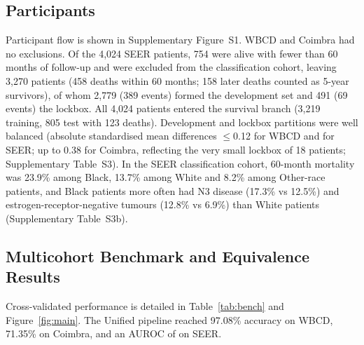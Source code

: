 \documentclass[11pt,a4paper]{article}
\begin{document}
\subsection{Participants}\label{sec:participants}
Participant flow is shown in Supplementary Figure~S1. WBCD and Coimbra had no exclusions. Of the 4,024 SEER patients, 754 were alive with fewer than 60 months of follow-up and were excluded from the classification cohort, leaving 3,270 patients (458 deaths within 60 months; 158 later deaths counted as 5-year survivors), of whom 2,779 (389 events) formed the development set and 491 (69 events) the lockbox. All 4,024 patients entered the survival branch (3,219 training, 805 test with 123 deaths). Development and lockbox partitions were well balanced (absolute standardised mean differences $\le$0.12 for WBCD and \seerMaxSMD{} for SEER; up to 0.38 for Coimbra, reflecting the very small lockbox of 18 patients; Supplementary Table~S3). In the SEER classification cohort, 60-month mortality was 23.9\% among Black, 13.7\% among White and 8.2\% among Other-race patients, and Black patients more often had N3 disease (17.3\% vs 12.5\%) and estrogen-receptor-negative tumours (12.8\% vs 6.9\%) than White patients (Supplementary Table~S3b).

\subsection{Multicohort Benchmark and Equivalence Results}\label{sec:multicohort-benchmark-and-equi}
Cross-validated performance is detailed in Table~\ref{tab:bench} and Figure~\ref{fig:main}. The Unified pipeline reached 97.08\% accuracy on WBCD, 71.35\% on Coimbra, and an AUROC of \seerUniAUC{} on SEER.
\end{document}
